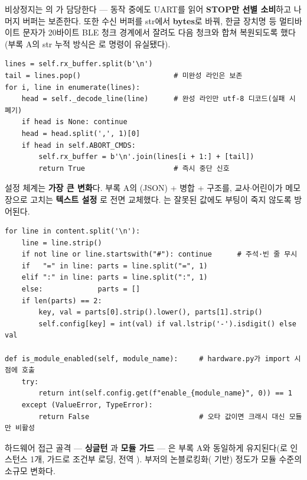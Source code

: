 \noindent 비상정지는 의 가 담당한다 --- 동작 중에도 UART를
읽어 \textbf{STOP만 선별 소비}하고 나머지 버퍼는 보존한다. 또한 수신 버퍼를 str에서
\textbf{bytes}로 바꿔, 한글 장치명 등 멀티바이트 문자가 20바이트 BLE 청크 경계에서 잘려도
다음 청크와 합쳐 복원되도록 했다(부록 A의 str 누적 방식은 로 명령이 유실됐다).

\begin{verbatim}
lines = self.rx_buffer.split(b'\n')
tail = lines.pop()                      # 미완성 라인은 보존
for i, line in enumerate(lines):
    head = self._decode_line(line)      # 완성 라인만 utf-8 디코드(실패 시 폐기)
    if head is None: continue
    head = head.split(',', 1)[0]
    if head in self.ABORT_CMDS:
        self.rx_buffer = b'\n'.join(lines[i + 1:] + [tail])
        return True                     # 즉시 중단 신호
\end{verbatim}

\noindent 설정 체계는 \textbf{가장 큰 변화}다. 부록 A의 (JSON) +
 병합 +  구조를, 교사$\cdot$어린이가 메모장으로 고치는
\textbf{텍스트 설정 }로 전면 교체했다. 는
잘못된 값에도 부팅이 죽지 않도록 방어된다.

\begin{verbatim}
for line in content.split('\n'):
    line = line.strip()
    if not line or line.startswith("#"): continue      # 주석·빈 줄 무시
    if   "=" in line: parts = line.split("=", 1)
    elif ":" in line: parts = line.split(":", 1)
    else:             parts = []
    if len(parts) == 2:
        key, val = parts[0].strip().lower(), parts[1].strip()
        self.config[key] = int(val) if val.lstrip('-').isdigit() else val

def is_module_enabled(self, module_name):     # hardware.py가 import 시점에 호출
    try:
        return int(self.config.get(f"enable_{module_name}", 0)) == 1
    except (ValueError, TypeError):
        return False                          # 오타 값이면 크래시 대신 모듈만 비활성
\end{verbatim}

\noindent 하드웨어 접근 골격 --- \textbf{싱글턴 }과 \textbf{모듈 가드} --- 은 부록 A와
동일하게 유지된다(로 인스턴스 1개, 
가드로 조건부 로딩, 전역 ). 부저의 논블로킹화(
기반) 정도가 모듈 수준의 소규모 변화다.

